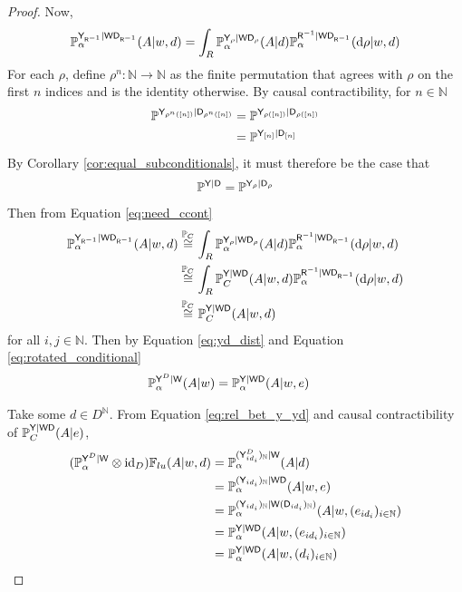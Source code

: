 \begin{proof}
Now,
\begin{align}
    \mathbb{P}^{\mathsf{Y}_{\mathsf{R}^{-1}}|\mathsf{W}\mathsf{D}_{\mathsf{R}^{-1}}}_\alpha(A|w,d) &= \int_R \mathbb{P}_\alpha^{\mathsf{Y}_\rho|\mathsf{W}\mathsf{D}_{\rho}}(A|d)\mathbb{P}_\alpha^{\mathsf{R}^{-1}|\mathsf{W}\mathsf{D}_{\mathsf{R}^{-1}}}(\mathrm{d}\rho|w,d)\label{eq:need_ccont}\\
\end{align}
For each $\rho$, define $\rho^n:\mathbb{N}\to \mathbb{N}$ as the finite permutation that agrees with $\rho$ on the first $n$ indices and is the identity otherwise. By causal contractibility, for $n\in \mathbb{N}$
\begin{align}
    \mathbb{P}^{\mathsf{Y}_{\rho^n([n])}|\mathsf{D}_{\rho^n([n])}} &= \mathbb{P}^{\mathsf{Y}_{\rho([n])}|\mathsf{D}_{\rho([n])}}\\
    &= \mathbb{P}^{\mathsf{Y}_{[n]}|\mathsf{D}_{[n]}}
\end{align}
By Corollary \ref{cor:equal_subconditionals}, it must therefore be the case that
\begin{align}
    \mathbb{P}^{\mathsf{Y}|\mathsf{D}} = \mathbb{P}^{\mathsf{Y}_{\rho}|\mathsf{D}_{\rho}}
\end{align}
Then from Equation \ref{eq:need_ccont}
\begin{align}
    \mathbb{P}^{\mathsf{Y}_{\mathsf{R}^{-1}}|\mathsf{W}\mathsf{D}_{\mathsf{R}^{-1}}}_\alpha(A|w,d) &\overset{\mathbb{P}_C}{\cong} \int_R \mathbb{P}_\alpha^{\mathsf{Y}_\rho|\mathsf{W}\mathsf{D}_{\rho}}(A|d)\mathbb{P}_\alpha^{\mathsf{R}^{-1}|\mathsf{W}\mathsf{D}_{\mathsf{R}^{-1}}}(\mathrm{d}\rho|w,d)\\
    &\overset{\mathbb{P}_C}{\cong} \int_R \mathbb{P}_C^{\mathsf{Y}|\mathsf{WD}}(A|w,d)\mathbb{P}_\alpha^{\mathsf{R}^{-1}|\mathsf{W}\mathsf{D}_{\mathsf{R}^{-1}}}(\mathrm{d}\rho|w,d)\\
    &\overset{\mathbb{P}_C}{\cong} \mathbb{P}_C^{\mathsf{Y}|\mathsf{WD}}(A|w,d)\label{eq:rotated_conditional}
\end{align}
 for all $i,j\in \mathbb{N}$. Then by Equation \ref{eq:yd_dist} and Equation \ref{eq:rotated_conditional}
\begin{align}
    \mathbb{P}_\alpha^{\mathsf{Y}^D|\mathsf{W}}(A|w) &= \mathbb{P}_\alpha^{\mathsf{Y}|\mathsf{WD}}(A|w,e)\label{eq:rel_bet_y_yd}
\end{align}

Take some $d\in D^{\mathbb{N}}$. From Equation \ref{eq:rel_bet_y_yd} and causal contractibility of $\mathbb{P}_C^{\mathsf{Y}|\mathsf{WD}}(A|e)$,
\begin{align}
    (\mathbb{P}_\alpha^{\mathsf{Y}^D|\mathsf{W}}\otimes \mathrm{id}_D)\mathbb{F}_{lu}(A|w,d) &= \mathbb{P}_\alpha^{(\mathsf{Y}^D_{i d_i})_{\mathbb{N}}|\mathsf{W}}(A|d)\\
    &=\mathbb{P}_\alpha^{(\mathsf{Y}_{i d_i})_{\mathbb{N}}|\mathsf{WD}}(A|w,e)\\
    &= \mathbb{P}_\alpha^{(\mathsf{Y}_{i d_i})_{\mathbb{N}}|\mathsf{W}(\mathsf{D}_{i d_i})_{\mathbb{N}})}(A|w,(e_{i d_i})_{i\in \mathbb{N}})\\
    &= \mathbb{P}_\alpha^{\mathsf{Y}|\mathsf{WD}}(A|w,(e_{i d_i})_{i\in \mathbb{N}})\\
    &= \mathbb{P}_\alpha^{\mathsf{Y}|\mathsf{WD}}(A|w,(d_i)_{i\in\mathbb{N}})
\end{align}


\end{proof}

